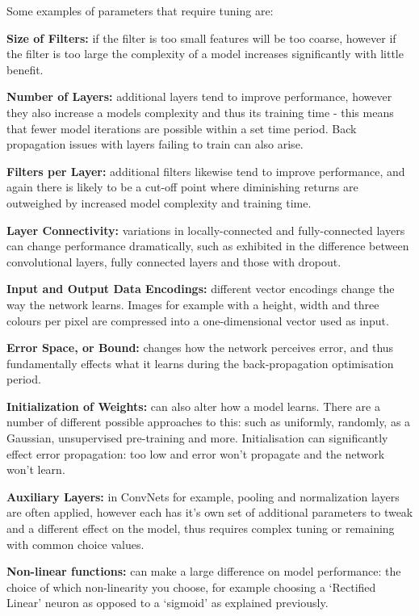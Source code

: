 \documentclass[a4paper,11pt,titlepage]{article}
\begin{document}
		\par 
		Some examples of parameters that require tuning are:
		\par
		\textbf{Size of Filters:} if the filter is too small features will be too coarse, however if the filter is too large the complexity of a model increases significantly with little benefit.
		\par
		\textbf{Number of Layers:} additional layers tend to improve performance, however they also increase a models complexity and thus its training time - this means that fewer model iterations are possible within a set time period. Back propagation issues with layers failing to train can also arise.
		\par 
		\textbf{Filters per Layer:} additional filters likewise tend to improve performance, and again there is likely to be a cut-off point where diminishing returns are outweighed by increased model complexity and training time.
		\par  
		\textbf{Layer Connectivity:} variations in locally-connected and fully-connected layers can change performance dramatically, such as exhibited in the difference between convolutional layers, fully connected layers and those with dropout.
		\par 
		\textbf{Input and Output Data Encodings:} different vector encodings change the way the network learns. Images for example with a height, width and three colours per pixel are compressed into a one-dimensional vector used as input.
		\par  		
		\textbf{Error Space, or Bound:} changes how the network perceives error, and thus fundamentally effects what it learns during the back-propagation optimisation period.
		\par		 		
		\textbf{Initialization of Weights:} can also alter how a model learns. There are a number of different possible approaches to this: such as uniformly, randomly, as a Gaussian, unsupervised pre-training and more. Initialisation can significantly effect error propagation: too low and error won't propagate and the network won't learn.
		\par 
		\textbf{Auxiliary Layers:} in ConvNets for example, pooling and normalization layers are often applied, however each has it's own set of additional parameters to tweak and a different effect on the model, thus requires complex tuning or remaining with common choice values.
		\par 
		\textbf{Non-linear functions:} can make a large difference on model performance: the choice of which non-linearity you choose, for example choosing a `Rectified Linear' neuron as opposed to a `sigmoid' as explained previously.
\end{document}
